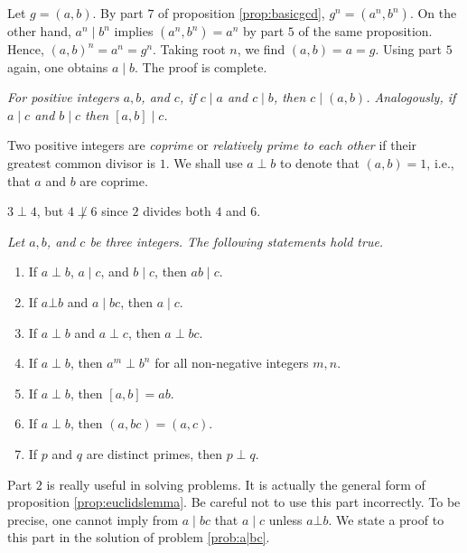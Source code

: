 \documentclass{subfile}
\begin{document}
	\begin{solution}
		Let $g=(a,b)$. By part $7$ of proposition \eqref{prop:basicgcd}, $g^n = (a^n,b^n)$. On the other hand, $a^n\mid b^n$ implies $(a^n, b^n)=a^n$ by part $5$ of the same proposition. Hence, $(a, b)^n=a^n=g^n$. Taking root $n$, we find $(a,b)=a=g$. Using part $5$ again, one obtains $a\mid b$. The proof is complete.

	\end{solution}

	\begin{proposition}\slshape\label{prop:dividegcd}
		For positive integers $a, b$, and $c$, if $c \mid a$ and $c\mid b$, then $c\mid (a,b)$. Analogously, if $a\mid c$ and $b\mid c$ then $[a,b]\mid c$.
	\end{proposition}

	\begin{definition}
		Two positive integers are \textit{coprime} or \textit{relatively prime to each other} if their greatest common divisor is $1$. We shall use $a\perp b$ to denote that $(a,b)=1$, i.e., that $a$ and $b$ are coprime.
	\end{definition}

	\begin{example}
		$3\perp4$, but $4\not\perp6$ since $2$ divides both $4$ and $6$.
	\end{example}

	\begin{proposition}\slshape\label{prop:cpdiv}
		Let $a, b$, and $c$ be three integers. The following statements hold true.
		\begin{enumerate}
			\item If $a\perp b$, $a\mid c$, and $b\mid c$, then $ab\mid c$.
			\item If $a \bot b$ and $a\mid bc$, then $a\mid c$.
			\item If $a\perp b$ and $a\perp c$, then $a\perp bc$.
			\item If $a\perp b$, then $a^m\perp b^n$ for all non-negative integers $m,n$.
			\item If $a \perp b$, then $[a,b]=ab$.
			\item If $a \perp b$, then $(a,bc)=(a,c)$.
			\item If $p$ and $q$ are distinct primes, then $p \perp q$.
		\end{enumerate}
	\end{proposition}

	\begin{note}[1]
		Part $2$ is really useful in solving problems. It is actually the general form of proposition \eqref{prop:euclidslemma}. Be careful not to use this part incorrectly. To be precise, one cannot imply from $a\mid bc$ that $a\mid c$ unless $a \bot b$. We state a proof to this part in the solution of problem \eqref{prob:a|bc}.
	\end{note}
\end{document}
